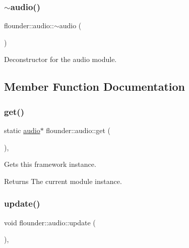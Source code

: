 \subsubsection{\texorpdfstring{$\sim$audio()}{~audio()}}
{\footnotesize\ttfamily flounder\+::audio\+::$\sim$audio (\begin{DoxyParamCaption}{ }\end{DoxyParamCaption})}



Deconstructor for the audio module. 



\subsection{Member Function Documentation}
\mbox{\label{classflounder_1_1audio_ac827774b8855e8a921ef9141c2515df8}} 
\subsubsection{\texorpdfstring{get()}{get()}}
{\footnotesize\ttfamily static \hyperlink{classflounder_1_1audio}{audio}$\ast$ flounder\+::audio\+::get (\begin{DoxyParamCaption}{ }\end{DoxyParamCaption})\hspace{0.3cm}{\ttfamily [inline]}, {\ttfamily [static]}}



Gets this framework instance. 

\begin{DoxyReturn}{Returns}
The current module instance. 
\end{DoxyReturn}
\mbox{\label{classflounder_1_1audio_aabff6a1996b8571404023b6ac17009b6}} 
\subsubsection{\texorpdfstring{update()}{update()}}
{\footnotesize\ttfamily void flounder\+::audio\+::update (\begin{DoxyParamCaption}{ }\end{DoxyParamCaption})\hspace{0.3cm}{\ttfamily [override]}, {\ttfamily [virtual]}}



